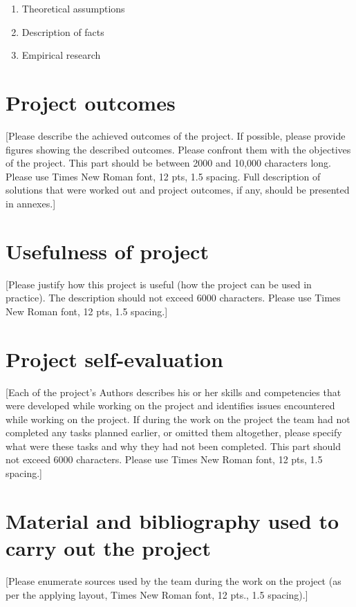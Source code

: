 \begin{enumerate}
    \item Theoretical assumptions
    \item Description of facts
    \item Empirical research
\end{enumerate}


\section{Project outcomes}\label{sec:project-outcomes}
[Please describe the achieved outcomes of the project.
If possible, please provide figures showing the described outcomes.
Please confront them with the objectives of the project.
This part should be between 2000 and 10,000 characters long.
Please use Times New Roman font, 12 pts, 1.5 spacing.
Full description of solutions that were worked out and project outcomes, if any, should be presented in annexes.]


\section{Usefulness of project}\label{sec:usefulness-of-project}
[Please justify how this project is useful (how the project can be used in practice).
The description should not exceed 6000 characters.
Please use Times New Roman font, 12 pts, 1.5 spacing.]


\section{Project self-evaluation}\label{sec:project-self-evaluation}
[Each of the project’s Authors describes his or her skills and competencies that were developed while working on the project and identifies issues encountered while working on the project.
If during the work on the project the team had not completed any tasks planned earlier, or omitted them altogether, please specify what were these tasks and why they had not been completed.
This part should not exceed 6000 characters.
Please use Times New Roman font, 12 pts, 1.5 spacing.]


\section{Material and bibliography used to carry out the project}\label{sec:material-and-bibliography-used-to-carry-out-the-project}
[Please enumerate sources used by the team during the work on the project (as per the applying layout, Times New Roman font, 12 pts., 1.5 spacing).]



